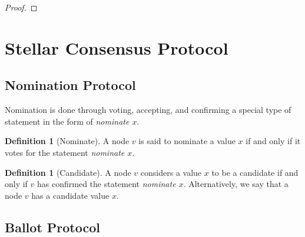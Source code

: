 \documentclass[12pt, psamsfonts]{amsart}
\theoremstyle{definition}
\newtheorem{defn}[thm]{Definition}
\theoremstyle{remark}
\numberwithin{equation}{subsection}
\begin{document}
\begin{proof}
\end{proof}

\newpage
\section{Stellar Consensus Protocol}
\subsection{Nomination Protocol}

Nomination is done through voting, accepting, and confirming a special type of statement in the form of \textit{nominate $x$}.

\begin{defn}[Nominate]
    A node $v$ is said to nominate a value $x$ if and only if it votes for the statement \textit{nominate $x$}.
\end{defn}

\begin{defn}[Candidate]
    A node $v$ considers a value $x$ to be a candidate if and only if $v$ has confirmed the statement \textit{nominate $x$}.
    Alternatively, we say that a node $v$ has a candidate value $x$.
\end{defn}

\newpage
\subsection{Ballot Protocol}
\end{document}
